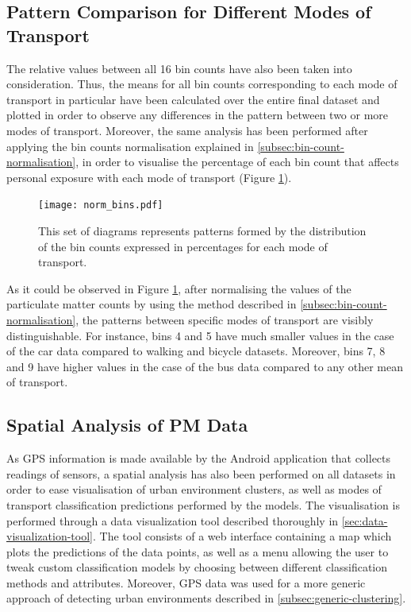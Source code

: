 \documentclass[bsc,frontabs,twoside,singlespacing, parskip,deptreport]{infthesis}     %
\begin{document}
\subsection{Pattern Comparison for Different Modes of Transport}

The relative values between all 16 bin counts have also been taken into consideration. Thus, the means for all bin counts corresponding to each mode of transport in particular have been calculated over the entire final dataset and plotted in order to observe any differences in the pattern between two or more modes of transport. Moreover, the same analysis has been performed after applying the bin counts normalisation explained in \ref{subsec:bin-count-normalisation}, in order to visualise the percentage of each bin count that affects personal exposure with each mode of transport (Figure \ref{fig:norm-bins}).

\begin{figure}[h!]
  \center
  \texttt{[image: norm\_bins.pdf]} 
  \caption{This set of diagrams represents patterns formed by the distribution of the bin counts expressed in percentages for each mode of transport.}
  \label{fig:norm-bins}
\end{figure}

As it could be observed in Figure \ref{fig:norm-bins}, after normalising the values of the particulate matter counts by using the method described in \ref{subsec:bin-count-normalisation}, the patterns between specific modes of transport are visibly distinguishable. For instance, bins 4 and 5 have much smaller values in the case of the car data compared to walking and bicycle datasets. Moreover, bins 7, 8 and 9 have higher values in the case of the bus data compared to any other mean of transport.

\subsection{Spatial Analysis of PM Data}

As GPS information is made available by the Android application that collects readings of sensors, a spatial analysis has also been performed on all datasets in order to ease visualisation of urban environment clusters, as well as modes of transport classification predictions performed by the models. The visualisation is performed through a data visualization tool described thoroughly in \ref{sec:data-visualization-tool}. The tool consists of a web interface containing a map which plots the predictions of the data points, as well as a menu allowing the user to tweak custom classification models by choosing between different classification methods and attributes. Moreover, GPS data was used for a more generic approach of detecting urban environments described in \ref{subsec:generic-clustering}.
\end{document}
